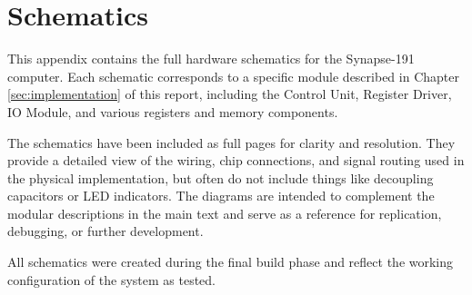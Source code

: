 \chapter{Schematics} \label{sec:appendix:schematics}

This appendix contains the full hardware schematics for the Synapse-191 computer. Each schematic corresponds to a specific module described in Chapter \ref{sec:implementation} of this report, including the Control Unit, Register Driver, IO Module, and various registers and memory components.

The schematics have been included as full pages for clarity and resolution. They provide a detailed view of the wiring, chip connections, and signal routing used in the physical implementation, but often do not include things like decoupling capacitors or LED indicators. The diagrams are intended to complement the modular descriptions in the main text and serve as a reference for replication, debugging, or further development.

All schematics were created during the final build phase and reflect the working configuration of the system as tested.














